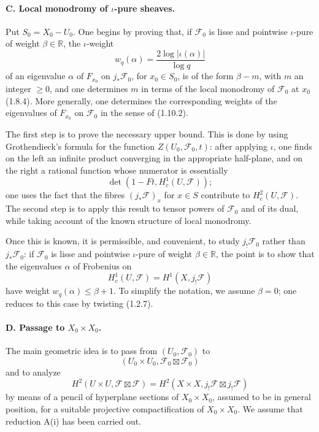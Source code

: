 \documentclass[11pt]{article}
\theoremstyle{remark}
\begin{document}
\paragraph{C. Local monodromy of $\iota$-pure sheaves.}
Put $S_0=X_0-U_0$. One begins by proving that, if $\mathcal F_0$ is lisse and pointwise $\iota$-pure of weight $\beta\in\mathbb R$, the $\iota$-weight
\[
w_q(\alpha)=\frac{2\log |\iota(\alpha)|}{\log q}
\]
of an eigenvalue $\alpha$ of $F_{x_0}$ on $j_*\mathcal F_0$, for $x_0\in S_0$, is of the form $\beta-m$, with $m$ an integer $\ge 0$, and one determines $m$ in terms of the local monodromy of $\mathcal F_0$ at $x_0$ (1.8.4). More generally, one determines the corresponding weights of the eigenvalues of $F_{x_0}$ on $\mathcal F_0$ in the sense of (1.10.2).

The first step is to prove the necessary upper bound. This is done by using Grothendieck's formula for the function $Z(U_0,\mathcal F_0,t)$: after applying $\iota$, one finds on the left an infinite product converging in the appropriate half-plane, and on the right a rational function whose numerator is essentially
\[
\det(1-Ft,H^1_c(U,\mathcal F));
\]
one uses the fact that the fibres $(j_*\mathcal F)_x$ for $x\in S$ contribute to $H^2_c(U,\mathcal F)$. The second step is to apply this result to tensor powers of $\mathcal F_0$ and of its dual, while taking account of the known structure of local monodromy.

Once this is known, it is permissible, and convenient, to study $j_!\mathcal F_0$ rather than $j_*\mathcal F_0$: if $\mathcal F_0$ is lisse and pointwise $\iota$-pure of weight $\beta\in\mathbb R$, the point is to show that the eigenvalues $\alpha$ of Frobenius on
\[
H^1_c(U,\mathcal F)=H^1(X,j_!\mathcal F)
\]
have weight $w_q(\alpha)\le \beta+1$. To simplify the notation, we assume $\beta=0$; one reduces to this case by twisting (1.2.7).

\paragraph{D. Passage to $X_0\times X_0$.}
The main geometric idea is to pass from $(U_0,\mathcal F_0)$ to
\[
(U_0\times U_0,\mathcal F_0\boxtimes\mathcal F_0)
\]
and to analyze
\[
H^2(U\times U,\mathcal F\boxtimes\mathcal F)
  = H^2(X\times X,j_!\mathcal F\boxtimes j_!\mathcal F)
\]
by means of a pencil of hyperplane sections of $X_0\times X_0$, assumed to be in general position, for a suitable projective compactification of $X_0\times X_0$. We assume that reduction A(i) has been carried out.
\end{document}

